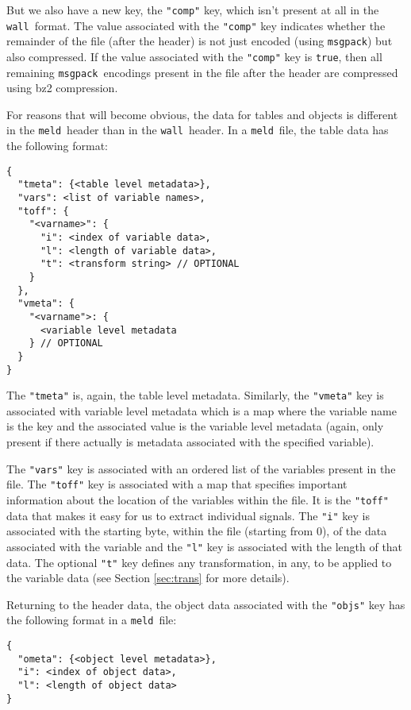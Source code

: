\documentclass[11pt,a4paper,twocolumn]{article}
\newcommand{\wall}{\texttt{wall}}
\newcommand{\meld}{\texttt{meld}}
\newcommand{\msgpack}{\texttt{msgpack}}
\newcommand{\code}[1]{\texttt{#1}} %
\begin{document}
But we also have a new key, the \code{"comp"} key, which isn't present
at all in the \wall\ format.  The value associated with the
\code{"comp"} key indicates whether the remainder of the file (after
the header) is not just encoded (using \msgpack) but also compressed.  If
the value associated with the \code{"comp"} key is \code{true}, then
all remaining \msgpack\ encodings present in the file after the header
are compressed using bz2\cite{BZ2} compression.

For reasons that will become obvious, the data for tables and objects
is different in the \meld\ header than in the \wall\ header.  In a
\meld\ file, the table data has the following format:

\begin{verbatim}
{
  "tmeta": {<table level metadata>},
  "vars": <list of variable names>,
  "toff": {
    "<varname>": {
      "i": <index of variable data>,
      "l": <length of variable data>,
      "t": <transform string> // OPTIONAL
    }
  },
  "vmeta": {
    "<varname">: {
      <variable level metadata
    } // OPTIONAL
  }
}
\end{verbatim}

The \code{"tmeta"} is, again, the table level metadata.  Similarly,
the \code{"vmeta"} key is associated with variable level metadata
which is a map where the variable name is the key and the associated
value is the variable level metadata (again, only present if there
actually is metadata associated with the specified variable).

The \code{"vars"} key is associated with an ordered list of the
variables present in the file.  The \code{"toff"} key is associated
with a map that specifies important information about the location of
the variables within the file.  It is the \code{"toff"} data that
makes it easy for us to extract individual signals.  The \code{"i"}
key is associated with the starting byte, within the file (starting
from 0), of the data associated with the variable and the \code{"l"}
key is associated with the length of that data.  The optional
\code{"t"} key defines any transformation, in any, to be applied to
the variable data (see Section \ref{sec:trans} for more details).

Returning to the header data, the object data associated with the
\code{"objs"} key has the following format in a \meld\ file:

\begin{verbatim}
{
  "ometa": {<object level metadata>},
  "i": <index of object data>,
  "l": <length of object data>
}
\end{verbatim}
\end{document}
